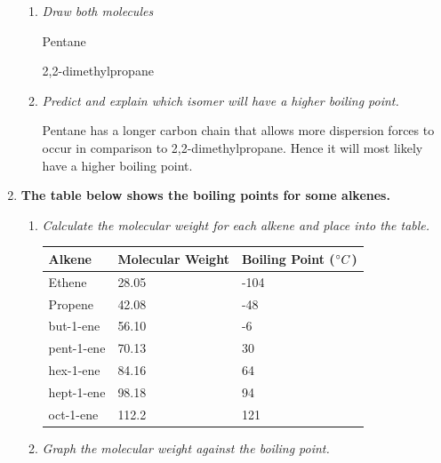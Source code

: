 \documentclass{report}
\begin{document}
\begin{enumerate}
\begin{enumerate}
				\item \textit{Draw both molecules}

					Pentane

					\begin{center}
					\end{center}

					2,2-dimethylpropane

					\begin{center}
					\end{center}

				\item \textit{Predict and explain which isomer will have a higher boiling point.}
					
					\subitem Pentane has a longer carbon chain that allows more dispersion forces to occur in comparison to 2,2-dimethylpropane. Hence it will most likely have a higher boiling point.
			\end{enumerate}
		
		\item \textbf{The table below shows the boiling points for some alkenes.}

			\begin{enumerate}
				\item \textit{Calculate the molecular weight for each alkene and place into the table.}

					\begin{table}[H]
						\centering
						\begin{tabular}{p{3cm}|p{4.5cm}|p{4.5cm}}
							\textbf{Alkene}		& \textbf{Molecular Weight}	& \textbf{Boiling Point ($\degree C$)}	\\ \hline
							Ethene			& 28.05				& -104					\\
							Propene			& 42.08				& -48					\\
							but-1-ene		& 56.10				& -6					\\
							pent-1-ene		& 70.13				& 30					\\
							hex-1-ene		& 84.16				& 64					\\
							hept-1-ene		& 98.18				& 94					\\
							oct-1-ene		& 112.2				& 121					\\
						\end{tabular}
					\end{table}

				\item \textit{Graph the molecular weight against the boiling point.}


\end{enumerate}
\end{enumerate}
\end{document}
